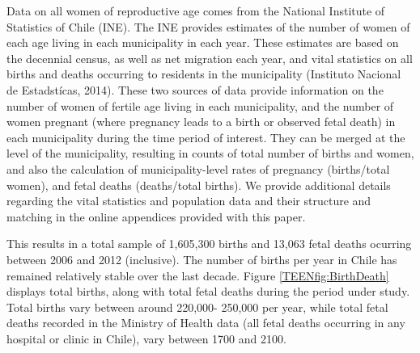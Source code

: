 Data on all women of reproductive age comes from the National Institute of 
Statistics of Chile (INE). The INE provides estimates of the number of women 
of each age living in each municipality in each year. These estimates are based 
on the decennial census, as well as net migration each year, and vital 
statistics on all births and deaths occurring to residents in the municipality 
(Instituto Nacional de Estadst\'icas, 2014). These two sources of data provide 
information on the number of women of fertile age living in each municipality, 
and the number of women pregnant (where pregnancy leads to a birth or observed
fetal death) in each municipality during the time period of interest. They can
be merged at the level of the municipality, resulting in counts of total number
of births and women, and also the calculation of municipality-level rates of
pregnancy (births/total women), and fetal deaths (deaths/total births).  We
provide additional details regarding the vital statistics and population data
and their structure and matching in the online appendices provided with this
paper.

This results in a total sample of 1,605,300 births and 13,063 fetal deaths
ocurring between 2006 and 2012 (inclusive).  The number of births per year in 
Chile has remained relatively stable over the last decade.  Figure
\ref{TEENfig:BirthDeath} displays total births, along with total fetal deaths
during the period under study.  Total births vary between around 220,000-%
250,000 per year, while total fetal deaths recorded in the Ministry of Health
data (all fetal deaths occurring in any hospital or clinic in Chile), vary
between 1700 and 2100.

